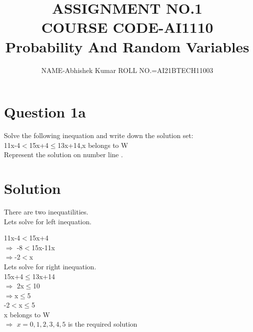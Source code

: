 \documentclass[12pt,two column]{article}
\begin{document}
\title{ASSIGNMENT NO.1  \\COURSE CODE-AI1110\\ Probability And Random Variables }
\author{NAME-Abhishek Kumar ROLL NO.=AI21BTECH11003}
\maketitle

\section*{ Question 1a}
 Solve the following inequation and write down the solution set:\\
11x-4$<$15x+4$\le$13x+14,x belongs to W\\
Represent the solution on number line .

 \section*{Solution}

There are two inequatilities.\\

Lets solve for left inequation.

11x-4$<$15x+4\\
$\Rightarrow$ -8$<$15x-11x\\
$\Rightarrow$-2$<$x\\

 Lets solve for right inequation.\\
 15x+4$\le$13x+14\\
$\Rightarrow$ 2x$\le$10\\
$\Rightarrow$x$\le$5\\

-2$<$x$\le$5\\


x belongs to W\\
$\Rightarrow$ $x=0,1,2,3,4,5$ is the required solution
\end{document}
